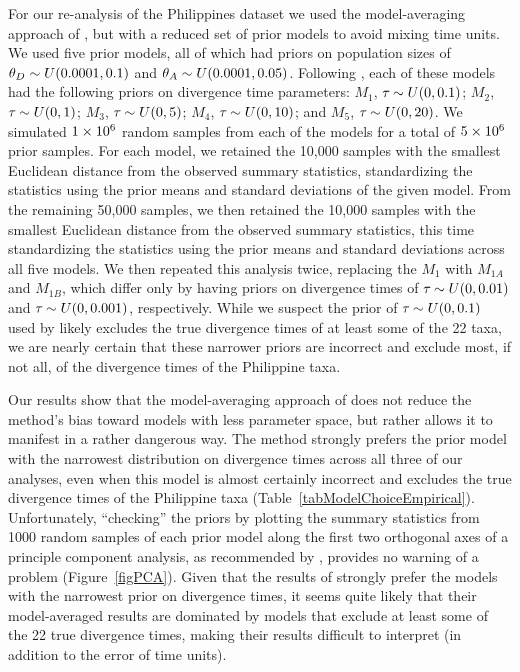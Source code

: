 For our re-analysis of the Philippines dataset we used the model-averaging
approach of \citet{Hickerson2013}, but with a reduced set of prior models to
avoid mixing time units.
We used five prior models, all of which had priors on population sizes of
$\meanDescendantTheta{} \sim U(0.0001, 0.1)$ and $\ancestralTheta{} \sim
U(0.0001, 0.05)$.
Following \citet{Hickerson2013}, each of these models had the following
priors on divergence time parameters:
$M_1$, $\tau_{} \sim U(0, 0.1)$;
$M_2$, $\tau_{} \sim U(0, 1)$;
$M_3$, $\tau_{} \sim U(0, 5)$;
$M_4$, $\tau_{} \sim U(0, 10)$; and
$M_5$, $\tau_{} \sim U(0, 20)$.
We simulated $1\times 10^{6}$ random samples from each of the models for a total of
$5\times 10^{6}$ prior samples.
For each model, we retained the 10,000 samples with the smallest Euclidean
distance from the observed summary statistics, standardizing the statistics
using the prior means and standard deviations of the given model.
From the remaining 50,000 samples, we then retained the 10,000 samples with the
smallest Euclidean distance from the observed summary statistics, this time
standardizing the statistics using the prior means and standard deviations
across all five models.
We then repeated this analysis twice, replacing the $M_1$ with
$M_{1A}$ and $M_{1B}$, which differ only by having priors on divergence
times of $\tau_{} \sim U(0, 0.01)$ and $\tau_{} \sim U(0, 0.001)$,
respectively.
While we suspect the prior of $\tau_{} \sim U(0, 0.1)$ used by
\citet{Hickerson2013} likely excludes the true divergence times of at least
some of the 22 taxa, we are nearly certain that these narrower priors are
incorrect and exclude most, if not all, of the divergence times of the
Philippine taxa.

Our results show that the model-averaging approach of \citet{Hickerson2013}
does not reduce the method's bias toward models with less parameter space,
but rather allows it to manifest in a rather dangerous way.
The method strongly prefers the prior model with the narrowest distribution on
divergence times across all three of our analyses, even when this model is
almost certainly incorrect and excludes the true divergence times of the
Philippine taxa (Table~\ref{tabModelChoiceEmpirical}).
Unfortunately, ``checking'' the priors by plotting the summary statistics from
1000 random samples of each prior model along the first two orthogonal axes of
a principle component analysis, as recommended by \citet{Hickerson2013},
provides no warning of a problem (Figure~\ref{figPCA}).
Given that the results of \citet{Hickerson2013} strongly prefer the models with
the narrowest prior on divergence times, it seems quite likely that their
model-averaged results are dominated by models that exclude at least some of
the 22 true divergence times, making their results difficult to interpret
(in addition to the error of time units).

